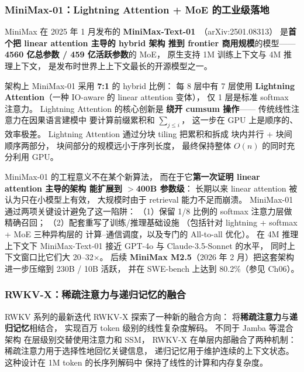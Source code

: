 \subsubsection{MiniMax-01：Lightning Attention + MoE 的工业级落地}
\label{sec:minimax01}

MiniMax 在 2025 年 1 月发布的
\textbf{MiniMax-Text-01}~\cite{minimax01}（arXiv:2501.08313）
是\textbf{首个把 linear attention 主导的 hybrid 架构
推到 frontier 商用规模}的模型——
\textbf{4560 亿总参数 / 459 亿活跃参数}的 MoE，
原生支持 1M 训练上下文与 4M 推理上下文，
是发布时世界上上下文最长的开源模型之一。

架构上 MiniMax-01 采用 \textbf{7:1} 的 hybrid 比例：
每 8 层中有 7 层使用 \textbf{Lightning Attention}（一种 IO-aware 的 linear attention 变体），
仅 1 层是标准 softmax 注意力。
Lightning Attention 的核心创新是
\textbf{绕开 cumsum 操作}——
传统线性注意力在因果语言建模中
要计算前缀累积和 \(\sum_{j \leq i}\)，
这一步在 GPU 上是顺序的、效率极差。
Lightning Attention 通过分块 tiling 把累积和拆成
块内并行 + 块间顺序两部分，
块间部分的规模远小于序列长度，
最终保持整体 \(O(n)\) 的同时充分利用 GPU。

MiniMax-01 的工程意义不在某个新算法，
而在于它\textbf{第一次证明 linear attention 主导的架构
能扩展到 \(>\)400B 参数级}：
长期以来 linear attention 被认为只在小模型上有效，
大规模时由于 retrieval 能力不足而崩溃。
MiniMax-01 通过两项关键设计避免了这一陷阱：
（1）保留 1/8 比例的 softmax 注意力层做精确召回；
（2）配套重写了训练/推理基础设施
（包括针对 lightning + softmax + MoE 三种异构层的
计算--通信调度，以及专门的 All-to-all 优化）。
在 4M 推理上下文下 MiniMax-Text-01 接近 GPT-4o 与 Claude-3.5-Sonnet 的水平，
同时上下文窗口比它们大 20--32$\times$。
后续 \textbf{MiniMax M2.5}（2026 年 2 月）把这套架构
进一步压缩到 230B / 10B 活跃，
并在 SWE-bench 上达到 80.2\%（参见 Ch06）。

\subsubsection{RWKV-X：稀疏注意力与递归记忆的融合}

RWKV 系列的最新迭代 RWKV-X 探索了一种新的融合方向：
将\textbf{稀疏注意力}与\textbf{递归记忆}相结合，
实现百万 token 级别的线性复杂度解码。
不同于 Jamba 等混合架构
在层级别交替使用注意力和 SSM，
RWKV-X 在单层内部融合了两种机制：
稀疏注意力用于选择性地回忆关键信息，
递归记忆用于维护连续的上下文状态。
这种设计在 1M token 的长序列解码中
保持了线性的计算和内存复杂度。

